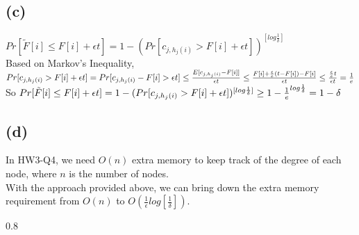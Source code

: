 \documentclass{article}
\newenvironment{myenv}[1]
  {\begin{spacing}{#1}}
  {\end{spacing}}
\begin{document}
\subsection{(c)}
$Pr[\tilde F[i]\le F[i]+\epsilon t] = 1-(Pr[c_{j,h_j(i)} > F[i] + \epsilon t])^{[log\frac{1}{\delta}]}$ \\
Based on Markov's Inequality, \\ $Pr[c_{j,h_j(i)} > F[i] + \epsilon t]  =  \\
Pr[c_{j,h_j(i)} - F[i] > \epsilon t]  \le \\
 \frac{E[c_{j,h_j(i)} - F[i]]}{\epsilon t} \le \\
  \frac{F[i]+\frac{\epsilon}{e}(t-F[i]) - F[i]}{\epsilon t} \le   \frac{\frac{\epsilon}{e}t}{\epsilon t} = \frac{1}{e}$
So $Pr[\tilde F[i]\le F[i]+\epsilon t] =  \\
1-(Pr[c_{j,h_j(i)} > F[i] + \epsilon t])^{[log\frac{1}{\delta}]} \ge
1 - \frac{1}{e}^{log\frac{1}{\delta}} = 1 - \delta$ \\

\subsection{(d)}
In HW3-Q4, we need $O(n)$ extra memory to keep track of the degree of each node, where $n$ is the number of nodes.\\
With the approach provided above, we can bring down the extra memory requirement from $O(n)$ to $O(\frac{1}{\epsilon}log[\frac{1}{\delta}])$.

\begin{myenv}{0.8}
\begin{verbatim}
\end{verbatim}
\end{myenv}
\end{document}
